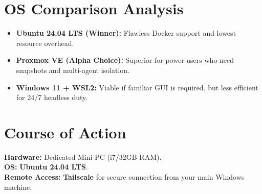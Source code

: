 \documentclass[11pt]{article}
\begin{document}
\section{OS Comparison Analysis}

\begin{itemize}
    \item \textbf{Ubuntu 24.04 LTS (Winner):} Flawless Docker support and lowest resource overhead.
    \item \textbf{Proxmox VE (Alpha Choice):} Superior for power users who need snapshots and multi-agent isolation.
    \item \textbf{Windows 11 + WSL2:} Viable if familiar GUI is required, but less efficient for 24/7 headless duty.
\end{itemize}

\section{Course of Action}
\textbf{Hardware:} Dedicated Mini-PC (i7/32GB RAM). \\
\textbf{OS:} \textcolor{secondary}{\textbf{Ubuntu 24.04 LTS}}. \\
\textbf{Remote Access:} \textbf{Tailscale} for secure connection from your main Windows machine.
\end{document}
